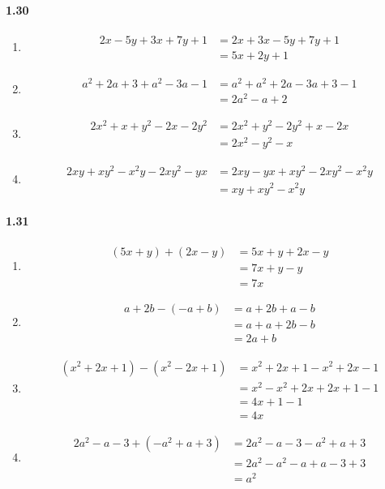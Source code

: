 \documentclass{article}
\newcommand\litem[1]{\item{\bfseries#1\space}}
\begin{document}
\paragraph{1.30}
\begin{enumerate}[label=\emph{\alph*})]
\litem{
\begin{align*}
  2x - 5y + 3x + 7y + 1 &= 2x + 3x -5y + 7y + 1 \\
  &= 5x + 2y + 1
\end{align*}
}
\litem{
  \begin{align*}
  a^2 + 2a + 3 + a^2 - 3a -1 &= a^2 + a^2 + 2a - 3a + 3 - 1 \\
  &= 2a^2 - a + 2
\end{align*}
}
\litem{
  \begin{align*}
  2x^2 + x + y^2 - 2x - 2y^2 &= 2x^2 + y^2 - 2y^2 + x - 2x \\
  &= 2x^2 - y^2 - x
\end{align*}
}
\litem{
  \begin{align*}
  2xy + xy^2 - x^2y - 2xy^2 - yx &= 2xy -yx + xy^2 - 2xy^2 - x^2y \\
  &=  xy + xy^2 - x^2y
\end{align*}
}
\end{enumerate}

\paragraph{1.31}
\begin{enumerate}[label=\emph{\alph*})]
\litem{
\begin{align*}
  (5x + y) + (2x - y) &= 5x + y + 2x - y \\
  &= 7x + y - y \\
  &= 7x
\end{align*}
}
\litem{
\begin{align*}
  a + 2b - (-a + b) &= a + 2b + a - b \\
  &= a + a + 2b - b \\
  &= 2a + b
\end{align*}
}
\litem{
\begin{align*}
  (x^2 + 2x + 1) - (x^2 - 2x + 1) &= x^2 + 2x + 1 - x^2 + 2x - 1 \\
  &=x^2 - x^2 + 2x + 2x + 1 - 1 \\
  &= 4x + 1 - 1 \\
  &= 4x
\end{align*}
}
\litem{
\begin{align*}
  2a^2 - a - 3 + (-a^2 + a + 3) &= 2a^2 - a - 3 - a^2 + a + 3 \\
  &= 2a^2 - a^2 - a + a - 3 + 3 \\
  &= a^2
\end{align*}
}
\end{enumerate}
\end{document}
